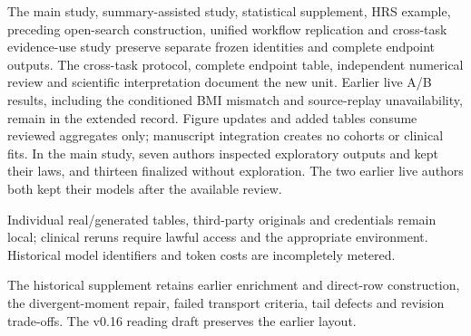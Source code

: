 \documentclass[sigconf,anonymous,review]{acmart}
\begin{document}
The main study, summary-assisted study, statistical supplement, HRS example, preceding open-search construction, unified workflow replication and cross-task evidence-use study preserve separate frozen identities and complete endpoint outputs. The cross-task protocol, complete endpoint table, independent numerical review and scientific interpretation document the new unit. Earlier live A/\allowbreak{}B results, including the conditioned BMI mismatch and source-replay unavailability, remain in the extended record. Figure updates and added tables consume reviewed aggregates only; manuscript integration creates no cohorts or clinical fits. In the main study, seven authors inspected exploratory outputs and kept their laws, and thirteen finalized without exploration. The two earlier live authors both kept their models after the available review.


Individual real/\allowbreak{}generated tables, third-party originals and credentials remain local; clinical reruns require lawful access and the appropriate environment. Historical model identifiers and token costs are incompletely metered.


The historical supplement retains earlier enrichment and direct-row construction, the divergent-moment repair, failed transport criteria, tail defects and revision trade-offs. The v0.16 reading draft preserves the earlier layout.
\end{document}
